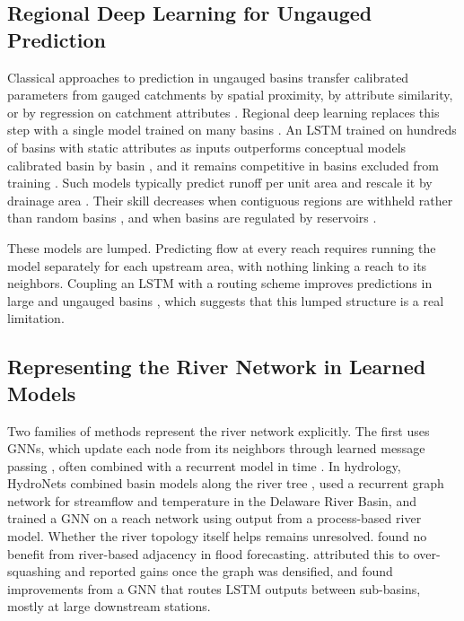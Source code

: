 \documentclass[draft]{agujournal2019}
\begin{document}
\subsection{Regional Deep Learning for Ungauged Prediction}
\label{sec:pub}

Classical approaches to prediction in ungauged basins transfer calibrated parameters from gauged catchments by spatial proximity, by attribute similarity, or by regression on catchment attributes \cite{Merz2004,Oudin2008,Razavi2013,Samaniego2010}. Regional deep learning replaces this step with a single model trained on many basins \cite{Shen2018}. An LSTM trained on hundreds of basins with static attributes as inputs outperforms conceptual models calibrated basin by basin \cite{Kratzert2019hess}, and it remains competitive in basins excluded from training \cite{Kratzert2019wrr,Arsenault2023}. Such models typically predict runoff per unit area and rescale it by drainage area \cite{Kratzert2019hess}. Their skill decreases when contiguous regions are withheld rather than random basins \cite{Feng2021}, and when basins are regulated by reservoirs \cite{Ouyang2021}.

These models are lumped. Predicting flow at every reach requires running the model separately for each upstream area, with nothing linking a reach to its neighbors. Coupling an LSTM with a routing scheme improves predictions in large and ungauged basins \cite{Yu2024}, which suggests that this lumped structure is a real limitation.

\subsection{Representing the River Network in Learned Models}
\label{sec:network}

Two families of methods represent the river network explicitly. The first uses GNNs, which update each node from its neighbors through learned message passing \cite{Kipf2017,Gilmer2017,Hamilton2017}, often combined with a recurrent model in time \cite{Li2018,YuB2018}. In hydrology, HydroNets combined basin models along the river tree \cite{Moshe2020},  used a recurrent graph network for streamflow and temperature in the Delaware River Basin, and  trained a GNN on a reach network using output from a process-based river model. Whether the river topology itself helps remains unresolved.  found no benefit from river-based adjacency in flood forecasting.  attributed this to over-squashing \cite{Alon2021} and reported gains once the graph was densified, and  found improvements from a GNN that routes LSTM outputs between sub-basins, mostly at large downstream stations.
\end{document}
